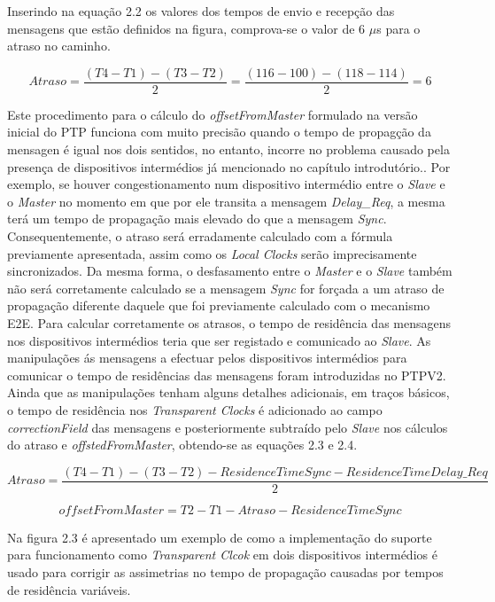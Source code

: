 Inserindo na equação 2.2 os valores dos tempos de envio e recepção das mensagens que estão definidos na figura, comprova-se o valor de 6 $\mu$s para o atraso no caminho. 

\[ Atraso =  \dfrac{(T4 - T1) - (T3 - T2)}{2} = \dfrac{(116 - 100) - (118 - 114)}{2} = 6\]

 Este procedimento para o cálculo do \textit{offsetFromMaster} formulado na versão inicial do PTP funciona com muito precisão quando o tempo de propagção da mensagen é igual nos dois sentidos, no entanto, incorre no problema causado pela presença de dispositivos intermédios já mencionado no capítulo introdutório.. Por exemplo, se houver congestionamento num dispositivo intermédio entre o \textit{Slave} e o \textit{Master} no momento em que por ele transita a mensagem \textit{Delay\_Req}, a mesma terá um tempo de propagação mais elevado do que a mensagem \textit{Sync}. Consequentemente, o atraso será erradamente calculado com a fórmula previamente apresentada, assim como os \textit{Local Clocks} serão imprecisamente sincronizados. Da mesma forma, o desfasamento entre o \textit{Master} e o \textit{Slave} também não será corretamente calculado se a mensagem \textit{Sync} for forçada a um atraso de propagação diferente daquele que foi previamente calculado com o mecanismo E2E. Para calcular corretamente os atrasos, o tempo de residência das mensagens nos dispositivos intermédios teria que ser registado e comunicado ao \textit{Slave}. As manipulações ás mensagens a efectuar pelos dispositivos intermédios para comunicar o tempo de residências das mensagens foram introduzidas no PTPV2. Ainda que as manipulações tenham alguns detalhes adicionais, em traços básicos, o tempo de residência nos \textit{Transparent Clocks} é adicionado ao campo \textit{correctionField} das mensagens e posteriormente subtraído pelo \textit{Slave} nos cálculos do atraso e \textit{offstedFromMaster}, obtendo-se as equações 2.3 e 2.4. 

\begin{equation}
    Atraso =  \dfrac{(T4 - T1) - (T3 - T2) - ResidenceTimeSync - 
    ResidenceTimeDelay\_Req}{2}
\end{equation}

\begin{equation}
    offsetFromMaster =  T2 - T1 - Atraso - ResidenceTimeSync
\end{equation}

Na figura 2.3 é apresentado um exemplo de como a implementação do suporte para funcionamento como \textit{Transparent Clcok} em dois dispositivos intermédios é usado para corrigir as assimetrias no tempo de propagação causadas por tempos de residência variáveis.


